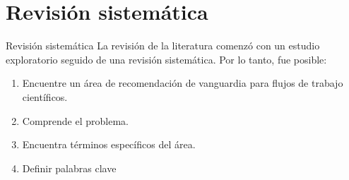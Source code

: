 \section{Revisión sistemática}

\begin{frame}		
	\begin{block}{Revisión sistemática}
		La revisión de la literatura comenzó con un estudio exploratorio seguido de una revisión sistemática. Por lo tanto, fue posible:
		\begin{enumerate}
			\item Encuentre un área de recomendación de vanguardia para flujos de trabajo científicos.
			\item Comprende el problema.
			\item Encuentra términos específicos del área.
			\item Definir palabras clave
		\end{enumerate}
	\end{block}
\end{frame}


